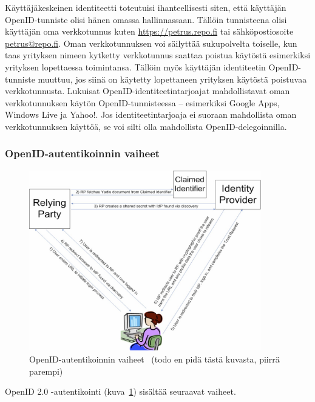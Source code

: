\documentclass[finnish,gradu]{tktltiki}
\begin{document}
  Käyttäjäkeskeinen identiteetti toteutuisi ihanteellisesti siten, että käyttäjän OpenID-tunniste olisi hänen omassa hallinnassaan. Tällöin tunnisteena olisi käyttäjän oma verkkotunnus kuten \url{https://petrus.repo.fi} tai sähköpostiosoite \url{petrus@repo.fi}. Oman verkkotunnuksen voi säilyttää sukupolvelta toiselle, kun taas yrityksen nimeen kytketty verkkotunnus saattaa poistua käytöstä esimerkiksi yrityksen lopettaessa toimintansa. Tällöin myös käyttäjän identiteetin OpenID-tunniste muuttuu, jos siinä on käytetty lopettaneen yrityksen käytöstä poistuvaa verkkotunnusta. Lukuisat OpenID-identiteetintarjoajat mahdollistavat oman verkkotunnuksen käytön OpenID-tunnisteessa -- esimerkiksi Google Apps, Windows Live ja Yahoo!. Jos identiteetintarjoaja ei suoraan mahdollista oman verkkotunnuksen käyttöä, se voi silti olla mahdollista OpenID-delegoinnilla.

  \subsubsection{OpenID-autentikoinnin vaiheet} %
  \label{ssub:openid_autentikoinnin_vaiheet}

  \begin{figure}
    \centering
    \includegraphics[width=0.9\textwidth]{images/openid_flow_recordon06.jpg}
    \caption{OpenID-autentikoinnin vaiheet~\cite{openid_recordon_2009} (todo en pidä tästä kuvasta, piirrä parempi)}
    \label{fig:basic_openid_flow}
  \end{figure}

  OpenID 2.0 -autentikointi (kuva~\ref{fig:basic_openid_flow}) sisältää seuraavat vaiheet.
\end{document}
